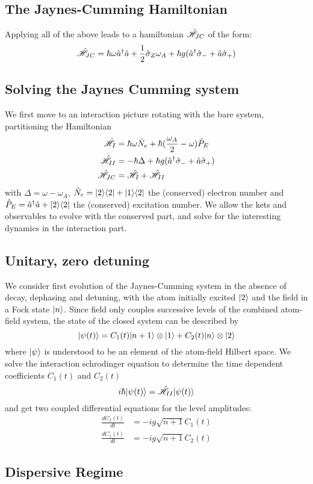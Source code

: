 \subsection{The Jaynes-Cumming Hamiltonian}
Applying all of the above leads to a hamiltonian $\hat{\mathscr{H}}_{JC}$ of the form:
\begin{equation}
	\hat{\mathscr{H}}_{JC} = \hbar \omega \hat{a}^\dagger \hat{a} +\frac{1}{2} \hat{\sigma}_Z \omega_A + \hbar g (\hat{a}^\dagger \hat{\sigma}_- + \hat{a} \hat{\sigma}_+)
	\label{HJC}
\end{equation}
\subsection{Solving the Jaynes Cumming system}
We first move to an interaction picture rotating with the bare system, partitioning the Hamiltonian
\begin{align}
	\hat{\mathscr{H}}_I &= \hbar \omega \hat{N}_e + \hbar(\frac{\omega_A}{2}-\omega)\hat{P}_E \\
	\hat{\mathscr{H}}_{II} &= -\hbar \Delta + \hbar g (\hat{a}^\dagger \hat{\sigma}_- + \hat{a} \hat{\sigma}_+) \\
	\hat{\mathscr{H}}_{JC} &= \hat{\mathscr{H}}_I+\hat{\mathscr{H}}_{II}
\end{align}
with $\Delta = \omega-\omega_A$,   $\hat{N}_e = | 2 \rangle \langle 2 | + | 1 \rangle \langle 2 | $ the (conserved) electron number and $\hat{P}_E = \hat{a}^\dagger\hat{a} + | 2 \rangle\langle 2 | $ the (conserved) excitation number. We allow the kets and observables to evolve with the conserved part, and solve for the interesting dynamics in the interaction part. 
\subsection{Unitary, zero detuning}
We consider first evolution of the Jaynes-Cumming system in the absence of decay, dephasing and detuning, with the atom initially excited $| 2 \rangle$ and the field in a Fock state $| n \rangle$. Since field only couples successive levels of the combined atom-field system, the state of the closed system can be described by
\begin{equation}
	| \psi(t) \rangle = C_1(t) | n+1 \rangle \otimes | 1 \rangle + C_2(t) | n \rangle \otimes | 2 \rangle
\end{equation}
where $| \psi \rangle$ is understood to be an element of the atom-field Hilbert space. We solve the interaction schrodinger equation to determine the time dependent coefficients $C_1(t)$ and $C_2(t)$
\begin{equation}
	i \hbar | \psi(t) \rangle = \hat{\mathscr{H}}_{II} | \psi(t) \rangle
\end{equation}
and get two coupled differential equations for the level amplitudes:
\begin{align}
	\frac{d C_2(t)}{dt} &= -i g \sqrt{n+1}C_1(t)\\
	\frac{d C_1(t)}{dt} &= -i g \sqrt{n+1}C_2(t)
\end{align}


\subsection{Dispersive Regime}